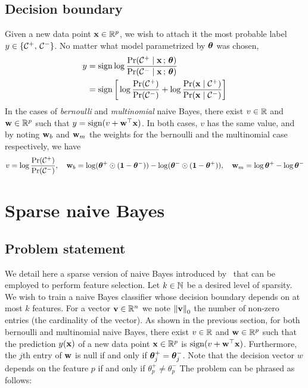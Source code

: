 \subsection{Decision boundary}\label{subsec:nb_bound}

Given a new data point $\mathbf{x} \in \mathbb{R}^p$, we wish to attach it the most probable label
$y \in \left\{ \mathcal{C}^+,\, \mathcal{C}^- \right\}$.
No matter what model parametrized by $\bm{\theta}$ was chosen,
\begin{align*}
        y &= \operatorname*{sign} \log \frac{\Pr(\mathcal{C}^+ \mid \mathbf{x} \,;\,\bm{\theta})}{\Pr(\mathcal{C}^- \mid \mathbf{x} \,;\,\bm{\theta})}\\
        &= \operatorname*{sign}\bigg[\log \frac{\Pr(\mathcal{C}^+)}{\Pr(\mathcal{C}^-)}
                + \log \frac{\Pr(\mathbf{x} \mid \mathcal{C}^+)}{\Pr(\mathbf{x} \mid \mathcal{C}^-)}\bigg]
\end{align*}
In the cases of \emph{bernoulli} and \emph{multinomial} naive Bayes,
there exist $v \in \mathbb{R}$ and $\mathbf{w} \in \mathbb{R}^p$ such that $y = \operatorname*{sign}(v + \mathbf{w}^\top\mathbf{x})$.
In both cases, $v$ has the same value, and by noting $\mathbf{w}_b$ and $\mathbf{w}_m$ the weights for the bernoulli
and the multinomial case respectively, we have
\begin{equation*}
        v = \log\frac{\Pr(\mathcal{C}^+)}{\Pr(\mathcal{C}^-)}
        ,\quad
        \mathbf{w}_b = \log(\bm{\theta}^+\odot(\mathbf{1} - \bm{\theta}^-)) - \log(\bm{\theta}^-\odot(\mathbf{1} - \bm{\theta}^+))
        ,\quad
        \mathbf{w}_m = \log\bm{\theta}^+ - \log\bm{\theta}^-
\end{equation*}


\section{Sparse naive Bayes}\label{sec:snb}

\subsection{Problem statement}\label{subsec:snb_ps}

We detail here a sparse version of naive Bayes introduced by~\cite{sparse_naive_bayes} that can be employed to
perform feature selection.
Let $k \in \mathbb{N}$ be a desired level of sparsity.
We wish to train a naive Bayes classifier whose decision boundary depends on at most $k$ features.
For a vector $\mathbf{v} \in \mathbb{R}^n$ we note $\left\lVert\mathbf{v}\right\rVert_0$ the number of non-zero entries
(the cardinality of the vector).
As shown in the previous section, for both bernoulli and multinomial naive Bayes,
there exist $v \in \mathbb{R}$ and $\mathbf{w} \in \mathbb{R}^p$ such that the prediction $y(\mathbf{x})$ of a new data point $\mathbf{x}\in\mathbb{R}^p$ is
$\operatorname*{sign}(v + \mathbf{w}^\top\mathbf{x})$.
Furthermore, the $j$th entry of $\mathbf{w}$ is null if and only if $\bm{\theta}^+_j = \bm{\theta}^-_j$.
Note that the decision vector $w$ depends on the feature $p$ if and only if $\theta^+_p \neq \theta^-_p$
The problem can be phrased as follows:


